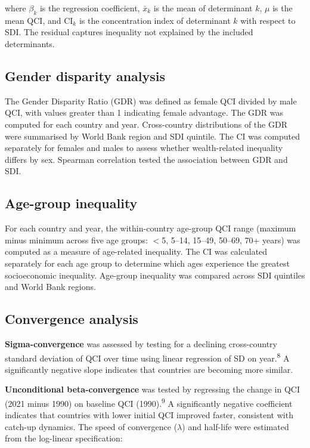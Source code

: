 \documentclass[12pt]{article}
\begin{document}
where $\beta_k$ is the regression coefficient, $\bar{x}_k$ is the mean of determinant $k$, $\mu$ is the mean QCI, and $\text{CI}_k$ is the concentration index of determinant $k$ with respect to SDI. The residual captures inequality not explained by the included determinants.

\subsection{Gender disparity analysis}

The Gender Disparity Ratio (GDR) was defined as female QCI divided by male QCI, with values greater than 1 indicating female advantage. The GDR was computed for each country and year. Cross-country distributions of the GDR were summarised by World Bank region and SDI quintile. The CI was computed separately for females and males to assess whether wealth-related inequality differs by sex. Spearman correlation tested the association between GDR and SDI.

\subsection{Age-group inequality}

For each country and year, the within-country age-group QCI range (maximum minus minimum across five age groups: $<$5, 5--14, 15--49, 50--69, 70+ years) was computed as a measure of age-related inequality. The CI was calculated separately for each age group to determine which ages experience the greatest socioeconomic inequality. Age-group inequality was compared across SDI quintiles and World Bank regions.

\subsection{Convergence analysis}

\textbf{Sigma-convergence} was assessed by testing for a declining cross-country standard deviation of QCI over time using linear regression of SD on year.\textsuperscript{8} A significantly negative slope indicates that countries are becoming more similar.

\textbf{Unconditional beta-convergence} was tested by regressing the change in QCI (2021 minus 1990) on baseline QCI (1990).\textsuperscript{9} A significantly negative coefficient indicates that countries with lower initial QCI improved faster, consistent with catch-up dynamics. The speed of convergence ($\lambda$) and half-life were estimated from the log-linear specification:
\end{document}
